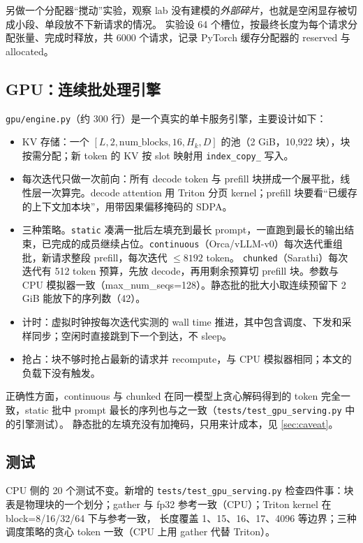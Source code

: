 \documentclass[11pt,a4paper]{ctexart}
\begin{document}
另做一个分配器“搅动”实验，观察 lab 没有建模的\emph{外部碎片}，也就是空闲显存被切成小段、单段放不下新请求的情况。
实验设 64 个槽位，按最终长度为每个请求分配张量、完成时释放，共 6000 个请求，记录 PyTorch 缓存分配器的 reserved 与 allocated。

\subsection{GPU：连续批处理引擎}\label{sec:engine-impl}
\texttt{gpu/engine.py}（约 300 行）是一个真实的单卡服务引擎，主要设计如下：
\begin{itemize}
\item KV 存储：一个 $[L,2,\text{num\_blocks},16,H_k,D]$ 的池（2 GiB，10,922 块），块按需分配；新 token 的 KV 按 slot 映射用 \texttt{index\_copy\_} 写入。
\item 每次迭代只做一次前向：所有 decode token 与 prefill 块拼成一个展平批，线性层一次算完。decode attention 用 Triton 分页 kernel；prefill 块要看“已缓存的上下文加本块”，用带因果偏移掩码的 SDPA。
\item 三种策略。\texttt{static} 凑满一批后左填充到最长 prompt，一直跑到最长的输出结束，已完成的成员继续占位。\texttt{continuous}（Orca/vLLM-v0）每次迭代重组批，新请求整段 prefill，每次迭代 $\le8192$ token。
\texttt{chunked}（Sarathi）每次迭代有 512 token 预算，先放 decode，再用剩余预算切 prefill 块。参数与 CPU 模拟器一致（max\_num\_seqs=128）。静态批的批大小取连续预留下 2 GiB 能放下的序列数（42）。
\item 计时：虚拟时钟按每次迭代实测的 wall time 推进，其中包含调度、下发和采样同步；空闲时直接跳到下一个到达，不 sleep。
\item 抢占：块不够时抢占最新的请求并 recompute，与 CPU 模拟器相同；本文的负载下没有触发。
\end{itemize}
正确性方面，continuous 与 chunked 在同一模型上贪心解码得到的 token 完全一致，static 批中 prompt 最长的序列也与之一致（\texttt{tests/test\_gpu\_serving.py} 中的引擎测试）。
静态批的左填充没有加掩码，只用来计成本，见 \cref{sec:caveat}。

\subsection{测试}
CPU 侧的 20 个测试不变。新增的 \texttt{tests/test\_gpu\_serving.py} 检查四件事：块表是物理块的一个划分；gather 与 fp32 参考一致（CPU）；Triton kernel 在 block=8/16/32/64 下与参考一致，
长度覆盖 1、15、16、17、4096 等边界；三种调度策略的贪心 token 一致（CPU 上用 gather 代替 Triton）。
\end{document}
